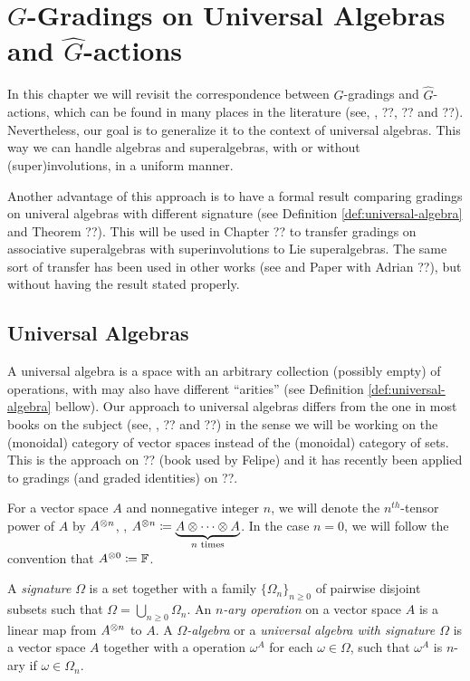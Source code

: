 \chapter{$G$-Gradings on Universal Algebras and $\widehat G$-actions}

In this chapter we will revisit the correspondence between $G$-gradings and $\widehat G$-actions, which can be found in many places in the literature (see, \eg, ??, ?? and ??). 
Nevertheless, our goal is to generalize it to the context of universal algebras. 
This way we can handle algebras and superalgebras, with or without (super)involutions, in a uniform manner. 

Another advantage of this approach is to have a formal result comparing gradings on univeral algebras with different signature (see Definition \ref{def:universal-algebra} and Theorem ??). 
This will be used in Chapter ?? to transfer gradings on associative superalgebras with superinvolutions to Lie superalgebras. 
The same sort of transfer has been used in other works (see \cite{livromicha} and Paper with Adrian ??), but without having the result stated properly. 

\section{Universal Algebras}

A universal algebra is a space with an arbitrary collection (possibly empty) of operations, with may also have different ``arities'' (see Definition \ref{def:universal-algebra} bellow). 
Our approach to universal algebras differs from the one in most books on the subject (see, \eg, ?? and ??) in the sense we will be working on the (monoidal) category of vector spaces instead of the (monoidal) category of sets. 
This is the approach on ?? (book used by Felipe) and it has recently been applied to gradings (and graded identities) on ??. 

\begin{notation}
    For a vector space $A$ and nonnegative integer $n$, we will denote the $n^{th}$-tensor power of $A$ by $A^{\otimes n}$, \ie,
    $A^{\otimes n} \coloneqq \underbrace{A\otimes\cdots\otimes A}_{n \text{ times}}$. 
    In the case $n = 0$, we will follow the convention that $A^{\otimes 0} \coloneqq \mathbb{F}$.
\end{notation}

\begin{defi}\label{def:universal-algebra}
    A \emph{signature} $\Omega$ is a set together with a family $\{ \Omega_n \}_{n \geq 0}$ of pairwise disjoint subsets such that $\Omega = \bigcup_{n \geq 0} \Omega_n$. 
    An \emph{$n$-ary operation} on a vector space $A$ is a linear map from $A^{\otimes n}$ to $A$. 
    A \emph{$\Omega$-algebra} or a \emph{universal algebra with signature $\Omega$} is a vector space $A$ together with a operation $\omega^A$ for each $\omega \in \Omega$, such that $\omega^A$ is $n$-ary if $\omega \in \Omega_n$.
\end{defi}

